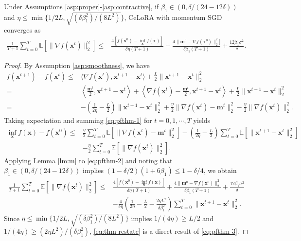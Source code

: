 \begin{theorem}\label{thm:celora-restate}
    Under Assumptions \ref{asp:proper}-\ref{asp:contractive}, if $\beta_1\in(0,\delta/(24-12\delta))$ and $\eta\le\min\{1/2L,\sqrt{(\delta\beta_1^2)/(8L^2)}\}$, CeLoRA with momentum SGD converges as
    \begin{align}
        \frac{1}{T+1}\sum_{t=0}^T\mathbb{E}[\|\nabla f(\mathbf{x}^t)\|_2^2]\le&\frac{4[f(\mathbf{x}^0)-\inf_{\mathbf{x}}f(\mathbf{x})]}{\delta\eta(T+1)}+\frac{4\|\mathbf{m}^0-\nabla f(\mathbf{x}^0)\|_2^2]}{\delta\beta_1(T+1)}+\frac{12\beta_1\sigma^2}{\delta}.\label{eq:thm-restate}
    \end{align}
\end{theorem}
\begin{proof}
    By Assumption \ref{asp:smoothness}, we have
    \begin{align}
        f(\mathbf{x}^{t+1})-f(\mathbf{x}^t)\le&\langle\nabla f(\mathbf{x}^t),\mathbf{x}^{t+1}-\mathbf{x}^t\rangle+\frac{L}{2}\|\mathbf{x}^{t+1}-\mathbf{x}^t\|_2^2\nonumber\\
        =&\left\langle\frac{\mathbf{m}^t}{2},\mathbf{x}^{t+1}-\mathbf{x}^t\right\rangle+\left\langle\nabla f(\mathbf{x}^t)-\frac{\mathbf{m}^t}{2},\mathbf{x}^{t+1}-\mathbf{x}^t\right\rangle+\frac{L}{2}\|\mathbf{x}^{t+1}-\mathbf{x}^t\|_2^2\nonumber\\
        =&-\left(\frac{1}{2\eta}-\frac{L}{2}\right)\|\mathbf{x}^{t+1}-\mathbf{x}^t\|_2^2+\frac{\eta}{2}\|\nabla f(\mathbf{x}^t)-\mathbf{m}^t\|_2^2-\frac{\eta}{2}\|\nabla f(\mathbf{x}^t)\|_2^2.\label{eq:pfthm-1}
    \end{align}
    Taking expectation and summing \eqref{eq:pfthm-1} for $t=0,1,\cdots,T$ yields
    \begin{align}
        \inf_{\mathbf{x}}f(\mathbf{x})-f(\mathbf{x}^0)\le&\frac{\eta}{2}\sum_{t=0}^{T}\mathbb{E}[\|\nabla f(\mathbf{x}^t)-\mathbf{m}^t\|_2^2]-\left(\frac{1}{2\eta}-\frac{L}{2}\right)\sum_{t=0}^{T}\mathbb{E}[\|\mathbf{x}^{t+1}-\mathbf{x}^t\|_2^2]\nonumber\\
        &-\frac{\eta}{2}\sum_{t=0}^T\mathbb{E}[\|\nabla f(\mathbf{x}^t)\|_2^2].\label{eq:pfthm-2}
    \end{align}
    Applying Lemma \ref{lm:m} to \eqref{eq:pfthm-2} and noting that $\beta_1\in(0,\delta/(24-12\delta))$ implies $(1-\delta/2)(1+6\beta_1)\le1-\delta/4$, we obtain
    \begin{align}
        \frac{1}{T+1}\sum_{t=0}^T\mathbb{E}[\|\nabla f(\mathbf{x}^t)\|_2^2]\le&\frac{4[f(\mathbf{x}^0)-\inf_{\mathbf{x}}f(\mathbf{x})]}{\delta\eta(T+1)}+\frac{4\|\mathbf{m}^0-\nabla f(\mathbf{x}^0)\|_2^2}{\delta\beta_1(T+1)}+\frac{12\beta_1\sigma^2}{\delta}\nonumber\\
        &-\frac{4}{\delta\eta}\left(\frac{1}{2\eta}-\frac{L}{2}-\frac{2\eta L^2}{\delta\beta_1^2}\right)\sum_{t=0}^T\|\mathbf{x}^{t+1}-\mathbf{x}^t\|_2^2.\label{eq:pfthm-3}
    \end{align}
   Since $\eta\le\min\{1/2L,\sqrt{(\delta\beta_1^2)/(8L^2)}\}$ implies $1/(4\eta)\ge L/2$ and $1/(4\eta)\ge(2\eta L^2)/(\delta\beta_1^2)$, \eqref{eq:thm-restate} is a direct result of \eqref{eq:pfthm-3}.
\end{proof}